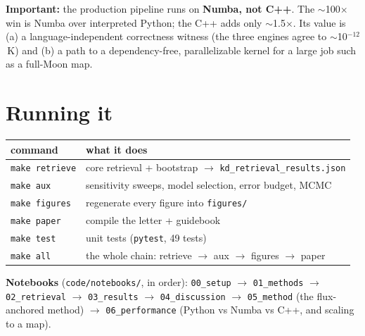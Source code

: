 \documentclass[11pt]{article}
\newcommand{\code}[1]{\texttt{\small #1}}
\begin{document}
\noindent
\textbf{Important:} the production pipeline runs on \textbf{Numba, not C++}. The
$\sim$100$\times$ win is Numba over interpreted Python; the C++ adds only
$\sim$1.5$\times$. Its value is (a) a language-independent correctness witness
(the three engines agree to $\sim$10$^{-12}$\,K) and (b) a path to a
dependency-free, parallelizable kernel for a large job such as a full-Moon map.

\section{Running it}

\begin{center}\small
\begin{tabular}{@{}ll@{}}
\toprule
command & what it does \\
\midrule
\code{make retrieve} & core retrieval + bootstrap $\to$ \code{kd_retrieval_results.json} \\
\code{make aux}      & sensitivity sweeps, model selection, error budget, MCMC \\
\code{make figures}  & regenerate every figure into \code{figures/} \\
\code{make paper}    & compile the letter + guidebook \\
\code{make test}     & unit tests (\code{pytest}, 49 tests) \\
\code{make all}      & the whole chain: retrieve $\to$ aux $\to$ figures $\to$ paper \\
\bottomrule
\end{tabular}
\end{center}

\noindent
\textbf{Notebooks} (\code{code/notebooks/}, in order):
\code{00_setup} $\to$ \code{01_methods} $\to$ \code{02_retrieval} $\to$
\code{03_results} $\to$ \code{04_discussion} $\to$ \code{05_method} (the
flux-anchored method) $\to$ \code{06_performance} (Python vs Numba vs C++, and
scaling to a map).
\end{document}
